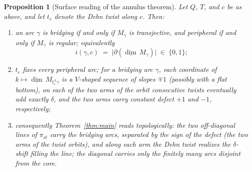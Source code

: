 \documentclass[11pt, a4paper]{amsart}
\newtheorem{proposition}[theorem]{Proposition}
\theoremstyle{definition}
\begin{document}
\begin{proposition}[Surface reading of the annulus theorem]
\label{prop:surface}
Let $Q$, $T$, and $c$ be as above, and let $t_c$ denote the Dehn twist
along $c$. Then:
\begin{enumerate}[label=\textup{(\arabic*)}]
\item an arc $\gamma$ is bridging if and only if $M_\gamma$ is
  transjective, and peripheral if and only if $M_\gamma$ is regular;
  equivalently
  \[
    i(\gamma, c) \;=\; \bigl|\partial(\underline{\dim}\, M_\gamma)\bigr|
    \;\in\; \{0, 1\};
  \]
\item $t_c$ fixes every peripheral arc; for a bridging arc $\gamma$, each
  coordinate of $k \mapsto \underline{\dim}\, M_{t_c^{\,k}\gamma}$ is a
  $V$-shaped sequence of slopes $\mp 1$ \textup{(}possibly with a flat
  bottom\textup{)}, on each of the two arms of the orbit consecutive
  twists eventually add exactly $\delta$, and the two arms carry constant
  defect $+1$ and $-1$, respectively;
\item consequently Theorem~\ref{thm:main} reads topologically: the two
  off-diagonal lines of $\pi_{st}$ carry the bridging arcs, separated by
  the sign of the defect \textup{(}the two arms of the twist
  orbits\textup{)}, and along each arm the Dehn twist realizes the
  $\delta$-shift filling the line; the diagonal carries only the finitely
  many arcs disjoint from the core.
\end{enumerate}
\end{proposition}
\end{document}
